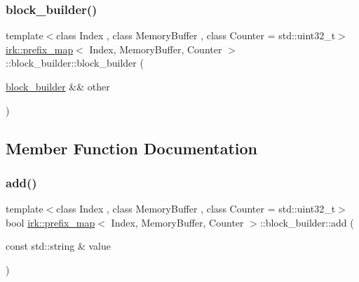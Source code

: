 \subsubsection{\texorpdfstring{block\+\_\+builder()}{block\_builder()}\hspace{0.1cm}{\footnotesize\ttfamily [2/2]}}
{\footnotesize\ttfamily template$<$class Index , class Memory\+Buffer , class Counter  = std\+::uint32\+\_\+t$>$ \\
\mbox{\hyperlink{classirk_1_1prefix__map}{irk\+::prefix\+\_\+map}}$<$ Index, Memory\+Buffer, Counter $>$\+::block\+\_\+builder\+::block\+\_\+builder (\begin{DoxyParamCaption}\item[{\mbox{\hyperlink{classirk_1_1prefix__map_1_1block__builder}{block\+\_\+builder}} \&\&}]{other }\end{DoxyParamCaption})\hspace{0.3cm}{\ttfamily [inline]}}



\subsection{Member Function Documentation}
\mbox{\label{classirk_1_1prefix__map_1_1block__builder_a7624581bf15668f0be6733f8105d4c59}} 
\subsubsection{\texorpdfstring{add()}{add()}}
{\footnotesize\ttfamily template$<$class Index , class Memory\+Buffer , class Counter  = std\+::uint32\+\_\+t$>$ \\
bool \mbox{\hyperlink{classirk_1_1prefix__map}{irk\+::prefix\+\_\+map}}$<$ Index, Memory\+Buffer, Counter $>$\+::block\+\_\+builder\+::add (\begin{DoxyParamCaption}\item[{const std\+::string \&}]{value }\end{DoxyParamCaption})\hspace{0.3cm}{\ttfamily [inline]}}

\mbox{\label{classirk_1_1prefix__map_1_1block__builder_acd19257e8bac2d4af07431383c1c2c16}} 
